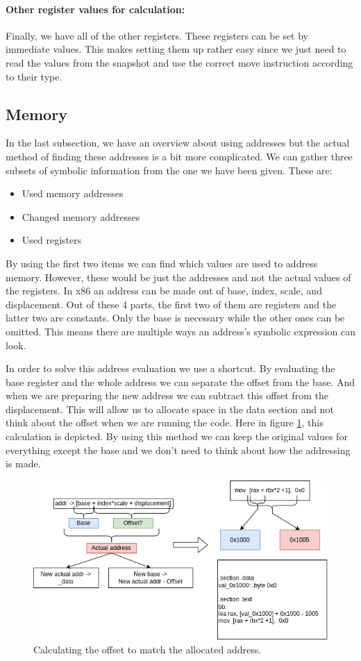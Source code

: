 \paragraph{Other register values for calculation:}
Finally, we have all of the other registers.
These registers can be set by immediate values.
This makes setting them up rather easy since we just need to read the values from the snapshot and use the correct move instruction according to their type. 

\subsection{Memory}
In the last subsection, we have an overview about using addresses but the actual method of finding these addresses is a bit more complicated.
We can gather three subsets of symbolic information from the one we have been given. These are:
\begin{itemize}
    \item Used memory addresses
    \item Changed memory addresses
    \item Used registers
\end{itemize}

By using the first two items we can find which values are used to address memory.
However, these would be just the addresses and not the actual values of the registers.
In x86 an address can be made out of base, index, scale, and displacement.
Out of these 4 parts, the first two of them are registers and the latter two are constants.
Only the base is necessary while the other ones can be omitted.
This means there are multiple ways an address's symbolic expression can look.

In order to solve this address evaluation we use a shortcut.
By evaluating the base register and the whole address we can separate the offset from the base.
And when we are preparing the new address we can subtract this offset from the displacement.
This will allow us to allocate space in the data section and not think about the offset when we are running the code.
Here in figure \ref{fig:mem_addr}, this calculation is depicted.
By using this method we can keep the original values for everything except the base and we don't need to think about how the addressing is made.

\begin{figure}[ht]
    \centering
    \includegraphics[width=0.9\linewidth]{figures/mem_addr}
    \caption{Calculating the offset to match the allocated address.}
    \label{fig:mem_addr}
\end{figure}

